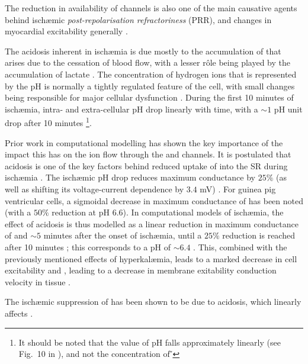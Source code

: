 \documentclass[../thesis-main.tex]{subfiles}
\begin{document}
The reduction in availability of \ina{} channels is also one of the main causative agents behind isch\ae{}mic \emph{post-repolarisation refractoriness} (PRR), and changes in myocardial excitability generally \citep{Coronel2012}.

The acidosis inherent in isch\ae{}mia is due mostly to the accumulation of  that arises due to the cessation of blood flow, with a lesser r\^ole being played by the accumulation of lactate \citep{Ichihara1984}. The concentration of hydrogen ions that is represented by the pH is normally a tightly regulated feature of the cell, with small changes being responsible for major cellular dysfunction \citep{Chen1998}. During the first 10 minutes of isch\ae{}mia, intra- and extra-cellular pH drop linearly with time, with a $\sim1$ pH unit drop after 10 minutes \citep{Shaw1997, Neely1975, Mohabir1991}\footnote{It should be noted that the value of pH falls approximately linearly (see Fig.~10 in \citet{Mohabir1991}), and not the concentration of \H{}}.

Prior work in computational modelling has shown the key importance of the impact this has on the ion flow through the \ina{} and \ica{} channels. It is postulated that acidosis is one of the key factors behind reduced uptake of \ca{} into the SR during isch\ae{}mia \citep{Krause1984}. The isch\ae{}mic pH drop reduces \ina{} maximum conductance by $25\%$ (as well as shifting its voltage-current dependence by $3.4$ mV) \citep{Kagiyama1982}. For guinea pig ventricular cells, a sigmoidal decrease in maximum conductance of \ica{} has been noted (with a $50\%$ reduction at pH $6.6$). In computational models of isch\ae{}mia, the effect of acidosis is thus modelled as a linear reduction in maximum conductance of \ina{} and \ica{} $\sim5$ minutes after the onset of isch\ae{}mia, until a $25\%$ reduction is reached after 10 minutes \citep{Trenor2007}; this corresponds to a pH of $\sim6.4$ \citep{Ferrero2003}. This, combined with the previously mentioned effects of hyperkal\ae{}mia, leads to a marked decrease in cell excitability and \dvdtmax{}, leading to a decrease in membrane exitability conduction velocity in tissue \citep{Shaw1997}.

The isch\ae{}mic suppression of \inak{} \citep{Dhalla1988} has been shown to be due to acidosis, which linearly affects \inak{} \citep{Severi2002}.
\end{document}
